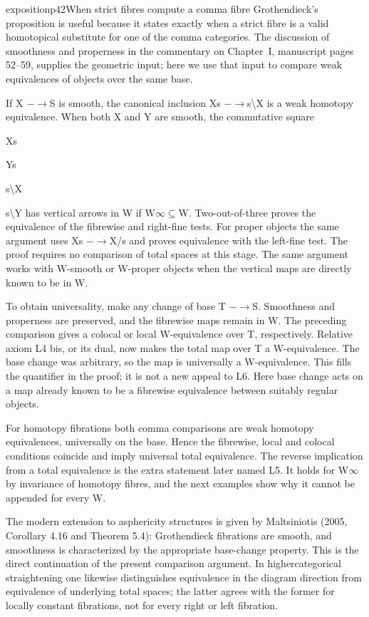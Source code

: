 \begin{dcomment}{exposition}{p42}{When strict fibres compute a comma fibre}
Grothendieck’s proposition is useful because it states exactly when a strict fibre is a valid homotopical substitute for one of the comma categories. The discussion of smoothness and properness in the commentary on Chapter~I, manuscript pages 52--59, supplies the geometric input; here we use that input to compare weak equivalences of objects over the same base.

If X \ensuremath{-}\ensuremath{\to}S is smooth, the canonical inclusion Xs \ensuremath{-}\ensuremath{\to}s\textbackslash{}X is a weak homotopy equivalence. When both X and Y are smooth, the commutative square

Xs

Ys

s\textbackslash{}X

s\textbackslash{}Y has vertical arrows in W if W\ensuremath{\infty}\ensuremath{\subseteq}W. Two-out-of-three proves the equivalence of the fibrewise and right-fine tests. For proper objects the same argument uses Xs \ensuremath{-}\ensuremath{\to}X/s and proves equivalence with the left-fine test. The proof requires no comparison of total spaces at this stage. The same argument works with W-smooth or W-proper objects when the vertical maps are directly known to be in W.

To obtain universality, make any change of base T \ensuremath{-}\ensuremath{\to}S. Smoothness and properness are preserved, and the fibrewise maps remain in W. The preceding comparison gives a colocal or local W-equivalence over T, respectively. Relative axiom L4 bis, or its dual, now makes the total map over T a W-equivalence. The base change was arbitrary, so the map is universally a W-equivalence. This fills the quantifier in the proof; it is not a new appeal to L6. Here base change acts on a map already known to be a fibrewise equivalence between suitably regular objects.

For homotopy fibrations both comma comparisons are weak homotopy equivalences, universally on the base. Hence the fibrewise, local and colocal conditions coincide and imply universal total equivalence. The reverse implication from a total equivalence is the extra statement later named L5. It holds for W\ensuremath{\infty} by invariance of homotopy fibres, and the next examples show why it cannot be appended for every W.

The modern extension to asphericity structures is given by Maltsiniotis (2005, Corollary 4.16 and Theorem 5.4): Grothendieck fibrations are smooth, and smoothness is characterized by the appropriate base-change property. This is the direct continuation of the present comparison argument. In highercategorical straightening one likewise distinguishes equivalence in the diagram direction from equivalence of underlying total spaces; the latter agrees with the former for locally constant fibrations, not for every right or left fibration.

\end{dcomment}

